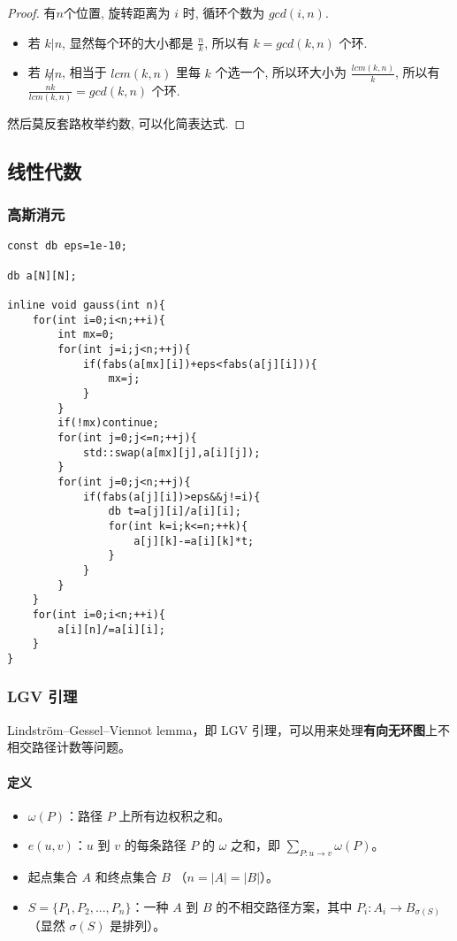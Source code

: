\documentclass{ctexart}
\begin{document}
\begin{proof}
    有$n$个位置, 旋转距离为 $i$ 时, 循环个数为 $gcd(i,n)$.

    \begin{itemize}
        \item 若 $k|n$, 显然每个环的大小都是 $\frac{n}{k}$, 所以有 $k = gcd(k,n)$ 个环.
        \item 若 $k\not |n$, 相当于 $lcm(k,n)$ 里每 $k$ 个选一个, 所以环大小为 $\frac{lcm(k,n)}{k}$, 所以有 $ \frac{nk}{lcm(k,n)} = gcd(k,n)$ 个环.
    \end{itemize}

    然后莫反套路枚举约数, 可以化简表达式.
\end{proof}
\subsection{线性代数}
\subsubsection{高斯消元}
\begin{lstlisting}
const db eps=1e-10;

db a[N][N];

inline void gauss(int n){
	for(int i=0;i<n;++i){
		int mx=0;
		for(int j=i;j<n;++j){
			if(fabs(a[mx][i])+eps<fabs(a[j][i])){
				mx=j;
			}
		}
		if(!mx)continue;
		for(int j=0;j<=n;++j){
			std::swap(a[mx][j],a[i][j]);
		}
		for(int j=0;j<n;++j){
			if(fabs(a[j][i])>eps&&j!=i){
				db t=a[j][i]/a[i][i];
				for(int k=i;k<=n;++k){
					a[j][k]-=a[i][k]*t;
				}
			}
		}
	}
	for(int i=0;i<n;++i){
		a[i][n]/=a[i][i];
	}
}
\end{lstlisting}
\subsubsection{LGV 引理}
Lindström–Gessel–Viennot lemma，即 LGV 引理，可以用来处理\textbf{有向无环图}上不相交路径计数等问题。

\paragraph{定义}
\begin{itemize}
    \item $\omega(P)$：路径 $P$ 上所有边权积之和。
    \item $e(u, v)$：$u$ 到 $v$ 的每条路径 $P$ 的 $\omega$ 之和，即 $\sum_{P: u\to v} \omega(P)$。
    \item 起点集合 $A$ 和终点集合 $B$ （$n = |A| = |B|$）。
    \item $S = \{P_1, P_2, ..., P_n\}$：一种 $A$ 到 $B$ 的不相交路径方案，其中 $P_i: A_i \to B_{\sigma(S)}$（显然 $\sigma(S)$ 是排列）。
\end{itemize}
\end{document}
